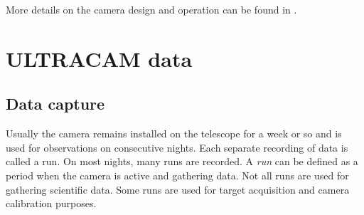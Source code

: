 More details on the camera design and operation can be found in \cite{dhillon07}.

\section{ULTRACAM data}

\subsection{Data capture}
Usually the camera remains installed on the telescope for a week or so and is used for observations on consecutive nights. Each separate recording of data is called a run. On most nights, many runs are recorded. A \emph{run} can be defined as a period when the camera is active and gathering data. Not all runs are used for gathering scientific data. Some runs are used for target acquisition and camera calibration purposes. 

